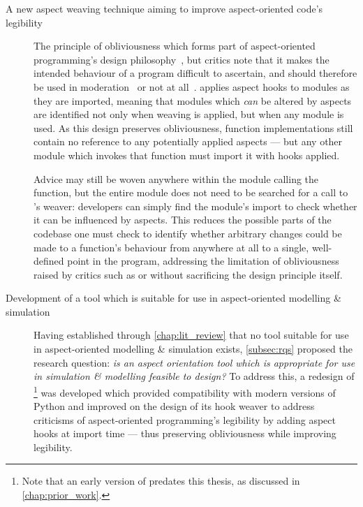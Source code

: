 \begin{description}

  \item[A new aspect weaving technique aiming to improve aspect-oriented code's legibility]
    The principle of obliviousness which forms part of aspect-oriented
    programming's design
    philosophy~\cite{filman2000aspect,kell2008survey,Charfi2006AspectOrientedWL},
    but critics note that it makes the intended behaviour of a program difficult
    to ascertain, and should therefore be used in
    moderation~\cite{leavens2007multiple} or not at
    all~\cite{przybylek2010wrong,Constantinides04aopconsidered}. \pdsf{} applies
    aspect hooks to modules as they are imported, meaning that modules which
    \emph{can} be altered by aspects are identified not only when weaving is
    applied, but when any module is used. As this design preserves
    obliviousness, function implementations still contain no reference to any
    potentially applied aspects --- but any other module which invokes that function
    must import it with hooks applied.

    Advice may still be woven anywhere within the module calling the function,
    but the entire module does not need to be searched for a call to \pdsf{}'s
    weaver: developers can simply find the module's import to check whether it
    can be influenced by aspects. This reduces the possible parts of the
    codebase one must check to identify whether arbitrary changes could be made
    to a function's behaviour from anywhere at all to a single, well-defined
    point in the program, addressing the limitation of obliviousness raised by
    critics such as \citet{leavens2007multiple} or
    \citet{Constantinides04aopconsidered} without sacrificing the design
    principle itself.


  \item[Development of a tool which is suitable for use in aspect-oriented
    modelling \& simulation] Having established through \cref{chap:lit_review}
    that no tool suitable for use in aspect-oriented modelling \& simulation
    exists, \cref{subsec:rqs} proposed the research question: \emph{
      is an aspect orientation tool which is appropriate for use in simulation
      \& modelling feasible to design?
    } To address this, a redesign of \pdsf{}\footnote{Note that an early version
    of \pdsf{} predates this thesis, as discussed in \cref{chap:prior_work}.}
    was developed which provided compatibility with modern versions of Python
    and improved on the design of its hook weaver to address criticisms of
    aspect-oriented programming's legibility by adding aspect hooks at import
    time --- thus preserving obliviousness while improving legibility.


\end{description}
